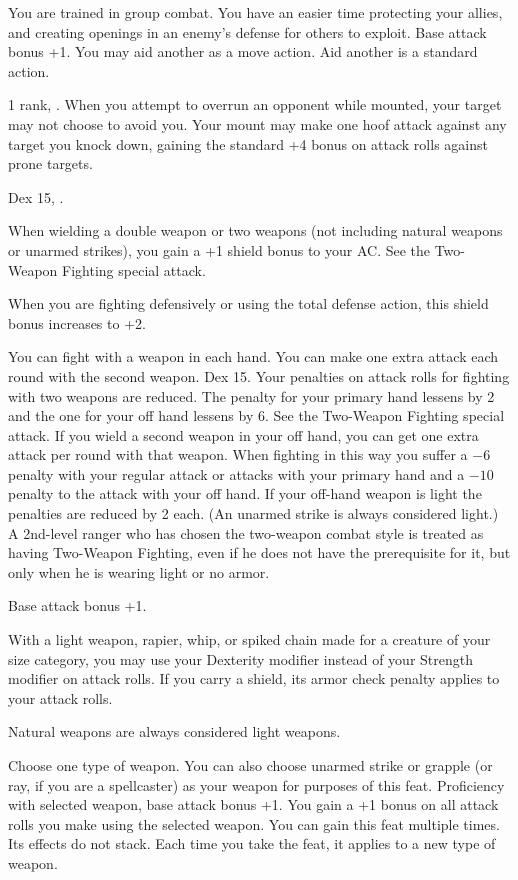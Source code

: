 {You are trained in group combat. You have an easier time protecting your allies, and creating openings in an enemy's defense for others to exploit.}
{Base attack bonus +1.}
{You may aid another as a move action.}
{Aid another is a standard action.}{}

{ 1 rank, .}
{When you attempt to overrun an opponent while mounted, your target may not choose to avoid you. Your mount may make one hoof attack against any target you knock down, gaining the standard +4 bonus on attack rolls against prone targets.}

{Dex 15, .}
{When wielding a double weapon or two weapons (not including natural weapons or unarmed strikes), you gain a +1 shield bonus to your AC. See the Two-Weapon Fighting special attack.

When you are fighting defensively or using the total defense action, this shield bonus increases to +2.}

{You can fight with a weapon in each hand. You can make one extra attack each round with the second weapon.}
{Dex 15.}
{Your penalties on attack rolls for fighting with two weapons are reduced. The penalty for your primary hand lessens by 2 and the one for your off hand lessens by 6. See the Two-Weapon Fighting special attack.}
{If you wield a second weapon in your off hand, you can get one extra attack per round with that weapon. When fighting in this way you suffer a $-6$ penalty with your regular attack or attacks with your primary hand and a $-10$ penalty to the attack with your off hand. If your off-hand weapon is light the penalties are reduced by 2 each. (An unarmed strike is always considered light.)}
{A 2nd-level ranger who has chosen the two-weapon combat style is treated as having Two-Weapon Fighting, even if he does not have the prerequisite for it, but only when he is wearing light or no armor.}

{Base attack bonus +1.}
{With a light weapon, rapier, whip, or spiked chain made for a creature of your size category, you may use your Dexterity modifier instead of your Strength modifier on attack rolls. If you carry a shield, its armor check penalty applies to your attack rolls.

Natural weapons are always considered light weapons.}

{Choose one type of weapon. You can also choose unarmed strike or grapple (or ray, if you are a spellcaster) as your weapon for purposes of this feat.}
{Proficiency with selected weapon, base attack bonus +1.}
{You gain a +1 bonus on all attack rolls you make using the selected weapon.}{}
{You can gain this feat multiple times. Its effects do not stack. Each time you take the feat, it applies to a new type of weapon.}

